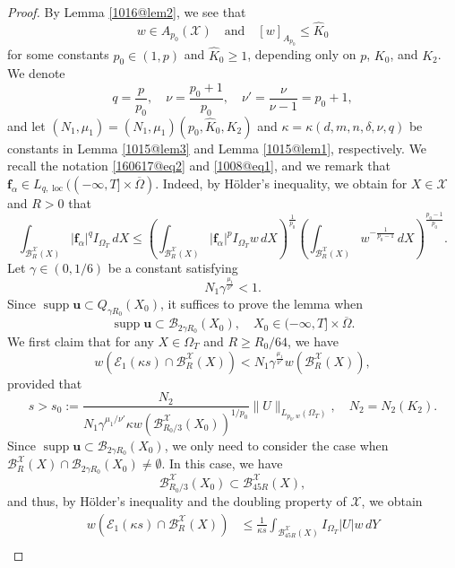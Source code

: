 \documentclass[reqno]{amsart}
\numberwithin{equation}{section}
\theoremstyle{plain}
\theoremstyle{definition}
\theoremstyle{remark}
\begin{document}
\begin{proof}
By Lemma \ref{1016@lem2}, we see that 
$$
w\in A_{p_0}({\mathcal{X}}) \quad \text{and}\quad [w]_{A_{p_0}}\le \hat{K}_0
$$
for some constants $p_0\in (1,p)$ and $\hat{K}_0\ge1$, depending only on $p$, $K_0$, and $K_2$.
We denote
$$
q=\frac{p}{p_0}, \quad \nu=\frac{p_0+1}{p_0}, \quad \nu'=\frac{\nu}{\nu-1}=p_0+1,
$$
and  let $(N_1,\mu_1)=(N_1,\mu_1)(p_0,\hat{K}_0,K_2)$ and  $\kappa=\kappa(d,m,n,\delta,\nu,q)$ be constants  in Lemma \ref{1015@lem3} and Lemma \ref{1015@lem1}, respectively.
We recall the notation \eqref{160617@eq2} and \eqref{1008@eq1}, and we remark that ${\boldsymbol{f}}_\alpha\in L_{q,\operatorname{loc}}((-\infty,T]\times \overline{\Omega})$.
Indeed, by H\"older's inequality, we obtain for $X\in {\mathcal{X}}$ and $R>0$ that   
$$
\int_{{\mathcal{B}}_R^{\mathcal{X}}(X)} |{\boldsymbol{f}}_\alpha|^qI_{\Omega_T}\,dX\le \left(\int_{{\mathcal{B}}_R^{\mathcal{X}}(X)}|{\boldsymbol{f}}_\alpha|^pI_{\Omega_T}w\,dX\right)^{\frac{1}{p_0}}\left(\int_{{\mathcal{B}}_R^{\mathcal{X}}(X)}w^{-\frac{1}{p_0-1}}\,dX\right)^{\frac{p_0-1}{p_0}}.
$$
Let  $\gamma\in (0,1/6)$ be a constant satisfying 
$$
N_1\gamma^{\frac{\mu_1}{\nu'}}<1.
$$
Since $\operatorname{supp}{\boldsymbol{u}}\subset Q_{\gamma R_0}(X_0)$, 
it suffices to prove the lemma when 
$$
\operatorname{supp}{\boldsymbol{u}}\subset {\mathcal{B}}_{2\gamma R_0}(X_0), \quad  X_0\in (-\infty,T]\times \overline{\Omega}.
$$
We first claim that for any $X\in \Omega_T$ and $R\ge R_0/64$, we have 
\begin{equation}		\label{1012@e2}
w({\mathcal{E}}_1(\kappa s)\cap {\mathcal{B}}_{R}^{\mathcal{X}}(X))<N_1 \gamma^{\frac{\mu_1}{\nu'}}w({\mathcal{B}}^{\mathcal{X}}_{R}(X)),
\end{equation}
provided that 
$$
s>s_0:= \frac{N_2}{N_1\gamma^{\mu_1/\nu'}\kappa w({\mathcal{B}}_{R_0/3}^{\mathcal{X}}(X_0))^{1/p_0}}\|U\|_{L_{p_0,w}(\Omega_T)}, \quad N_2=N_2(K_2).
$$
Since $\operatorname{supp} {\boldsymbol{u}}\subset {\mathcal{B}}_{2\gamma R_0}(X_0)$, we only need to consider the case when ${\mathcal{B}}_{R}^{\mathcal{X}}(X)\cap {\mathcal{B}}_{2\gamma R_0}(X_0)\neq \emptyset$.
In this case, we have
$$
{\mathcal{B}}_{R_0/3}^{\mathcal{X}}(X_0)\subset {\mathcal{B}}_{45R}^{\mathcal{X}}(X), 
$$
and thus, by H\"older's inequality and the doubling property of ${\mathcal{X}}$, we obtain
\begin{align*}
w({\mathcal{E}}_1(\kappa s)\cap {\mathcal{B}}_{R}^{\mathcal{X}}(X))&\le \frac{1}{\kappa s}\int_{{\mathcal{B}}_{45R}^{\mathcal{X}}(X)}I_{\Omega_T}|U|w\,dY\\

\end{align*}
\end{proof}
\end{document}
